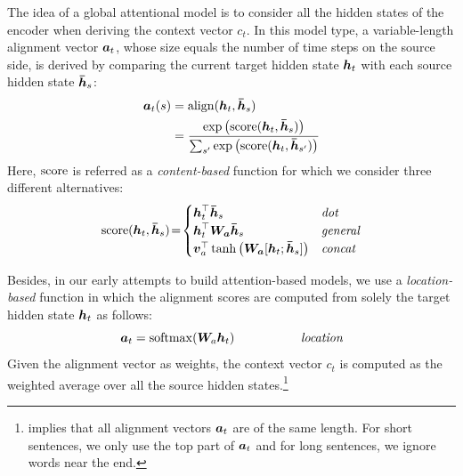 The idea of a global attentional model is to consider all the hidden states of
the encoder when deriving the context vector $c_t$. In this model type, a
variable-length alignment vector $\mbox{\boldmath{$a$}}_{t}$, whose size equals the number of time
steps on the source side, is derived by comparing the current target hidden
state $\mbox{\boldmath{$h$}}_{t}$ with each source hidden state $\mbox{\boldmath{$\bar{h}$}}_{s}$:
\begin{align}
\label{e:al}
\mbox{\boldmath{$a$}}_{t}(s)&=\operatorname{align}(\mbox{\boldmath{$h$}}_{t}, \mbox{\boldmath{$\bar{h}$}}_{s}) \\
&=\frac{\exp \left(\operatorname{score}(\mbox{\boldmath{$h$}}_{t}, \mbox{\boldmath{$\bar{h}$}}_{s})\right)}{\sum_{s'} \exp \left(\operatorname{score}(\mbox{\boldmath{$h$}}_{t},
\mbox{\boldmath{$\bar{h}$}}_{s'})\right)} \notag
\end{align}
Here, $\operatorname{score}$ is referred as a {\it content-based} function for which we consider three different
alternatives:
\begin{equation*}
\operatorname{score}(\mbox{\boldmath{$h$}}_{t}, \mbox{\boldmath{$\bar{h}$}}_{s})\!=\!\begin{cases}
    \mbox{\boldmath{$h$}}_{t}^\top \mbox{\boldmath{$\bar{h}$}}_{s} & \mbox{{\it dot}}\\
    \mbox{\boldmath{$h$}}_{t}^\top \mbox{\boldmath{$W_a$}} \mbox{\boldmath{$\bar{h}$}}_{s} & \mbox{{\it general}} \\
    \mbox{\boldmath{$v$}}_a^\top\tanh\left(\mbox{\boldmath{$W_a$}} [\mbox{\boldmath{$h$}}_{t}; \mbox{\boldmath{$\bar{h}$}}_{s}]\right) & \mbox{{\it concat}}
\end{cases}
\end{equation*}

Besides, in our early attempts to build attention-based models, we use
a {\it location-based} function in which the alignment scores are
computed from solely the target hidden state $\mbox{\boldmath{$h$}}_{t}$ as
follows:
\begin{equation}
\mbox{\boldmath{$a$}}_{t} = \operatorname{softmax}(\bm{W}_{a}\mbox{\boldmath{$h$}}_{t}) \mbox{ } \mbox{ } \mbox{ } \mbox{ } \mbox{ } \mbox{ } \mbox{ } \mbox{ } \mbox{ } \mbox{ } \mbox{ } \mbox{ } \mbox{ } \mbox{ } \mbox{ } \mbox{ } \mbox{{\it location}}
\label{e:location}
\end{equation}
Given the alignment vector as weights, the
context vector $c_t$ is computed as the  weighted average over all the source hidden states.\footnote{ implies that
all alignment vectors $\mbox{\boldmath{$a$}}_{t}$ are of the same length. For short sentences, we only
use the top part of $\mbox{\boldmath{$a$}}_{t}$ and for long sentences, we ignore words near the end.}

